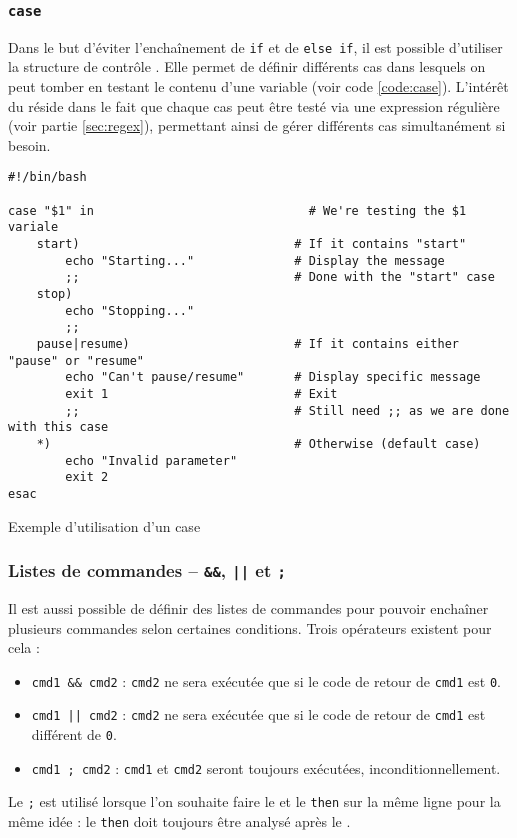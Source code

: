 \subsubsection{\texttt{case}} 
Dans le but d'éviter l'enchaînement de \texttt{if} et de \texttt{else if}, il est possible d'utiliser la structure de contrôle . Elle permet de définir différents cas dans lesquels on peut tomber en testant le contenu d'une variable (voir code \ref{code:case}). L'intérêt du  réside dans le fait que chaque cas peut être testé via une expression régulière (voir partie \ref{sec:regex}), permettant ainsi de gérer différents cas simultanément si besoin.

\begin{code}
    \centering
    \begin{verbatim}
#!/bin/bash

case "$1" in                              # We're testing the $1 variale
    start)                              # If it contains "start"
        echo "Starting..."              # Display the message
        ;;                              # Done with the "start" case
    stop)
        echo "Stopping..."
        ;;
    pause|resume)                       # If it contains either "pause" or "resume"
        echo "Can't pause/resume"       # Display specific message
        exit 1                          # Exit
        ;;                              # Still need ;; as we are done with this case
    *)                                  # Otherwise (default case)
        echo "Invalid parameter"
        exit 2
esac
\end{verbatim}
\vspace{-\baselineskip}
    \caption{Exemple d'utilisation d'un case}
    \label{code:case}
\end{code}

\subsubsection{Listes de commandes -- \texttt{\&\&}, \texttt{||} et \texttt{;}}

Il est aussi possible de définir des listes de commandes pour pouvoir enchaîner plusieurs commandes selon certaines conditions. Trois opérateurs existent pour cela :
\begin{itemize}
    \item \texttt{cmd1 && cmd2} : \texttt{cmd2} ne sera exécutée que si le code de retour de \texttt{cmd1} est \texttt{0}.
    \item \texttt{cmd1 || cmd2} : \texttt{cmd2} ne sera exécutée que si le code de retour de \texttt{cmd1} est différent de \texttt{0}.
    \item \texttt{cmd1 ; cmd2} : \texttt{cmd1} et \texttt{cmd2} seront toujours exécutées, inconditionnellement.
\end{itemize}
 Le \texttt{;} est utilisé lorsque l'on souhaite faire le  et le \texttt{then} sur la même ligne pour la même idée : le \texttt{then} doit toujours être analysé après le .

